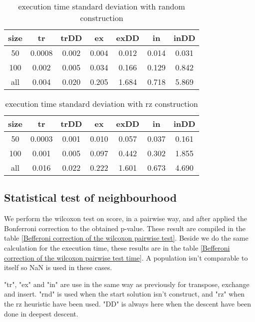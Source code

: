 \documentclass[12pt,a4paper]{article}
\begin{document}
\begin{table}[!h]
\centering
\begin{tabular}{|*{7}{c|}}
  \hline
  size & tr & trDD & ex & exDD & in & inDD \\
  \hline
  50 & 0.0008 & 0.002 & 0.004 & 0.012 & 0.014 & 0.031 \\ 
  100 & 0.002 & 0.005 & 0.034 & 0.166 & 0.129 & 0.842 \\
  all & 0.004 & 0.020 & 0.205 & 1.684 & 0.718 & 5.869 \\
  \hline
\end{tabular}
\caption{execution time standard deviation with random construction}
\label{Execution time with random construction sd}
\end{table}


\begin{table}[!h]
\centering
\begin{tabular}{|*{7}{c|}}
  \hline
  size & tr & trDD & ex & exDD & in & inDD \\
  \hline
  50 & 0.0003 & 0.001 & 0.010 & 0.057 & 0.037 & 0.161 \\ 
  100 & 0.001 & 0.005 & 0.097 & 0.442 & 0.302 & 1.855 \\
  all & 0.016 & 0.022 & 0.222 & 1.601 & 0.673 & 4.690 \\
  \hline
\end{tabular}
\caption{execution time standard deviation with rz construction}
\label{Execution time with rz construction sd}
\end{table}


\subsection{Statistical test of neighbourhood}

We perform the wilcoxon test on score, in a pairwise way, and after applied the Bonferroni correction to the obtained p-value. These result are compiled in the table \ref{Befferoni correction of the wilcoxon pairwise test}. Beside we do the same calculation for the execution time, these results are in the table \ref{Befferoni correction of the wilcoxon pairwise test time}. A population isn't comparable to itself so NaN is used in these cases.

"tr", "ex" and "in" are use in the same way as previously for transpose, exchange and insert. "rnd" is used when the start solution isn't construct, and "rz" when the rz heuristic have been used. "DD" is always here when the descent have been done in deepest descent.
\end{document}
